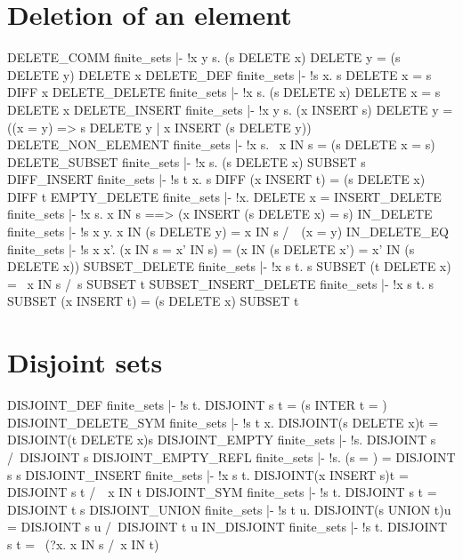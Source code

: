 \section{Deletion of an element}
\THEOREM DELETE\_COMM finite\_sets
|- !x y s. (s DELETE x) DELETE y = (s DELETE y) DELETE x
\ENDTHEOREM
\THEOREM DELETE\_DEF finite\_sets
|- !s x. s DELETE x = s DIFF {x}
\ENDTHEOREM
\THEOREM DELETE\_DELETE finite\_sets
|- !x s. (s DELETE x) DELETE x = s DELETE x
\ENDTHEOREM
\THEOREM DELETE\_INSERT finite\_sets
|- !x y s.
    (x INSERT s) DELETE y =
    ((x = y) => s DELETE y | x INSERT (s DELETE y))
\ENDTHEOREM
\THEOREM DELETE\_NON\_ELEMENT finite\_sets
|- !x s. ~x IN s = (s DELETE x = s)
\ENDTHEOREM
\THEOREM DELETE\_SUBSET finite\_sets
|- !x s. (s DELETE x) SUBSET s
\ENDTHEOREM
\THEOREM DIFF\_INSERT finite\_sets
|- !s t x. s DIFF (x INSERT t) = (s DELETE x) DIFF t
\ENDTHEOREM
\THEOREM EMPTY\_DELETE finite\_sets
|- !x. {} DELETE x = {}
\ENDTHEOREM
\THEOREM INSERT\_DELETE finite\_sets
|- !x s. x IN s ==> (x INSERT (s DELETE x) = s)
\ENDTHEOREM
\THEOREM IN\_DELETE finite\_sets
|- !s x y. x IN (s DELETE y) = x IN s /\ ~(x = y)
\ENDTHEOREM
\THEOREM IN\_DELETE\_EQ finite\_sets
|- !s x x'.
    (x IN s = x' IN s) = (x IN (s DELETE x') = x' IN (s DELETE x))
\ENDTHEOREM
\THEOREM SUBSET\_DELETE finite\_sets
|- !x s t. s SUBSET (t DELETE x) = ~x IN s /\ s SUBSET t
\ENDTHEOREM
\THEOREM SUBSET\_INSERT\_DELETE finite\_sets
|- !x s t. s SUBSET (x INSERT t) = (s DELETE x) SUBSET t
\ENDTHEOREM
\section{Disjoint sets}
\THEOREM DISJOINT\_DEF finite\_sets
|- !s t. DISJOINT s t = (s INTER t = {})
\ENDTHEOREM
\THEOREM DISJOINT\_DELETE\_SYM finite\_sets
|- !s t x. DISJOINT(s DELETE x)t = DISJOINT(t DELETE x)s
\ENDTHEOREM
\THEOREM DISJOINT\_EMPTY finite\_sets
|- !s. DISJOINT {} s /\ DISJOINT s {}
\ENDTHEOREM
\THEOREM DISJOINT\_EMPTY\_REFL finite\_sets
|- !s. (s = {}) = DISJOINT s s
\ENDTHEOREM
\THEOREM DISJOINT\_INSERT finite\_sets
|- !x s t. DISJOINT(x INSERT s)t = DISJOINT s t /\ ~x IN t
\ENDTHEOREM
\THEOREM DISJOINT\_SYM finite\_sets
|- !s t. DISJOINT s t = DISJOINT t s
\ENDTHEOREM
\THEOREM DISJOINT\_UNION finite\_sets
|- !s t u. DISJOINT(s UNION t)u = DISJOINT s u /\ DISJOINT t u
\ENDTHEOREM
\THEOREM IN\_DISJOINT finite\_sets
|- !s t. DISJOINT s t = ~(?x. x IN s /\ x IN t)
\ENDTHEOREM
